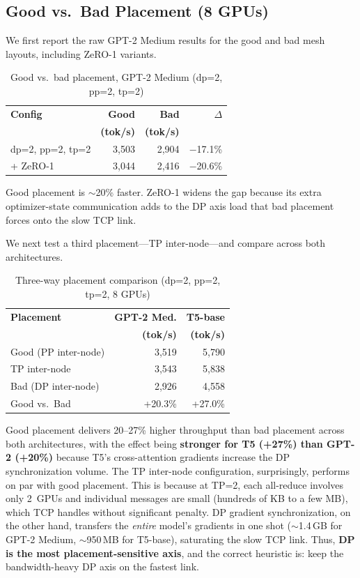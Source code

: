 \documentclass[conference]{IEEEtran}
\begin{document}
\subsection{Good vs.\ Bad Placement (8 GPUs)}

We first report the raw GPT-2 Medium results for the good and bad mesh layouts, including ZeRO-1 variants.

\begin{table}[h]
\centering
\caption{Good vs.\ bad placement, GPT-2 Medium (dp=2, pp=2, tp=2)}
\label{tab:goodbad_raw}
\small
\begin{tabular}{lrrr}
\toprule
\textbf{Config} & \textbf{Good} & \textbf{Bad} & \textbf{$\Delta$} \\
 & \textbf{(tok/s)} & \textbf{(tok/s)} & \\
\midrule
dp=2, pp=2, tp=2 & 3,503 & 2,904 & $-$17.1\% \\
+ ZeRO-1 & 3,044 & 2,416 & $-$20.6\% \\
\bottomrule
\end{tabular}
\end{table}

Good placement is $\sim$20\% faster. ZeRO-1 widens the gap because its extra optimizer-state communication adds to the DP axis load that bad placement forces onto the slow TCP link.

We next test a third placement---TP inter-node---and compare across both architectures.

\begin{table}[h]
\centering
\caption{Three-way placement comparison (dp=2, pp=2, tp=2, 8 GPUs)}
\label{tab:placement}
\small
\begin{tabular}{lrr}
\toprule
\textbf{Placement} & \textbf{GPT-2 Med.} & \textbf{T5-base} \\
 & \textbf{(tok/s)} & \textbf{(tok/s)} \\
\midrule
Good (PP inter-node) & 3,519 & 5,790 \\
TP inter-node & 3,543 & 5,838 \\
Bad (DP inter-node) & 2,926 & 4,558 \\
\midrule
Good vs.\ Bad & +20.3\% & +27.0\% \\
\bottomrule
\end{tabular}
\end{table}

Good placement delivers 20--27\% higher throughput than bad placement across both architectures, with the effect being \textbf{stronger for T5 (+27\%) than GPT-2 (+20\%)} because T5's cross-attention gradients increase the DP synchronization volume. The TP inter-node configuration, surprisingly, performs on par with good placement. This is because at TP=2, each all-reduce involves only 2~GPUs and individual messages are small (hundreds of KB to a few MB), which TCP handles without significant penalty. DP gradient synchronization, on the other hand, transfers the \textit{entire} model's gradients in one shot ($\sim$1.4\,GB for GPT-2 Medium, $\sim$950\,MB for T5-base), saturating the slow TCP link. Thus, \textbf{DP is the most placement-sensitive axis}, and the correct heuristic is: keep the bandwidth-heavy DP axis on the fastest link.
\end{document}
